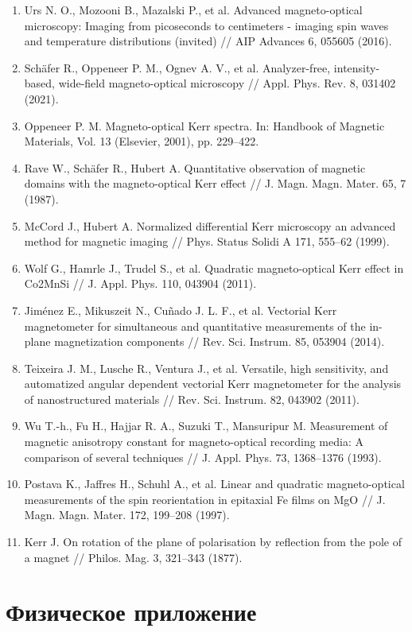 \documentclass[12pt,a4paper]{article}
\numberwithin{equation}{section}
\begin{document}
\begin{enumerate}
  \item Urs N. O., Mozooni B., Mazalski P., et al. Advanced magneto-optical microscopy: Imaging from picoseconds to centimeters - imaging spin waves and temperature distributions (invited) // AIP Advances 6, 055605 (2016).
  \item Schäfer R., Oppeneer P. M., Ognev A. V., et al. Analyzer-free, intensity-based, wide-field magneto-optical microscopy // Appl. Phys. Rev. 8, 031402 (2021).
  \item Oppeneer P. M. Magneto-optical Kerr spectra. In: Handbook of Magnetic Materials, Vol. 13 (Elsevier, 2001), pp. 229–422.
  \item Rave W., Schäfer R., Hubert A. Quantitative observation of magnetic domains with the magneto-optical Kerr effect // J. Magn. Magn. Mater. 65, 7 (1987).
  \item McCord J., Hubert A. Normalized differential Kerr microscopy an advanced method for magnetic imaging // Phys. Status Solidi A 171, 555–62 (1999).
  \item Wolf G., Hamrle J., Trudel S., et al. Quadratic magneto-optical Kerr effect in Co2MnSi // J. Appl. Phys. 110, 043904 (2011).
  \item Jiménez E., Mikuszeit N., Cuñado J. L. F., et al. Vectorial Kerr magnetometer for simultaneous and quantitative measurements of the in-plane magnetization components // Rev. Sci. Instrum. 85, 053904 (2014).
  \item Teixeira J. M., Lusche R., Ventura J., et al. Versatile, high sensitivity, and automatized angular dependent vectorial Kerr magnetometer for the analysis of nanostructured materials // Rev. Sci. Instrum. 82, 043902 (2011).
  \item Wu T.-h., Fu H., Hajjar R. A., Suzuki T., Mansuripur M. Measurement of magnetic anisotropy constant for magneto-optical recording media: A comparison of several techniques // J. Appl. Phys. 73, 1368–1376 (1993).
  \item Postava K., Jaffres H., Schuhl A., et al. Linear and quadratic magneto-optical measurements of the spin reorientation in epitaxial Fe films on MgO // J. Magn. Magn. Mater. 172, 199–208 (1997).
  \item Kerr J. On rotation of the plane of polarisation by reflection from the pole of a magnet // Philos. Mag. 3, 321–343 (1877).
\end{enumerate}

\newpage
\appendix

\section{Физическое приложение}
\end{document}

